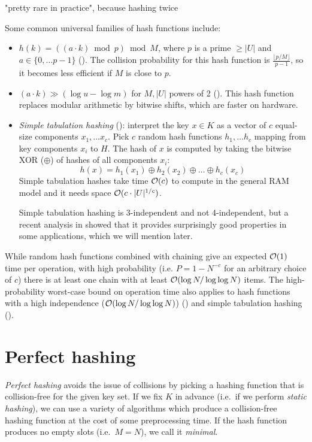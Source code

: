 
"pretty rare in practice", because hashing twice


Some common universal families of hash functions include:
\begin{itemize}
\item $h(k)=((a\cdot k)\bmod p)\bmod M$, where $p$ is a prime $\geq |U|$
	and $a\in\{0,\ldots p-1\}$ (\cite{univ-classes}).
	The collision probability for this hash function is
	$\frac{\lfloor p/M\rfloor}{p-1}$, so it becomes less efficient
	if $M$ is close to $p$.
\item $(a\cdot k)\gg(\log u-\log m)$ for $M, |U|$ powers of 2
	(\cite{dietzfelbinger}).
	This hash function replaces modular arithmetic by bitwise shifts,
	which are faster on hardware.
\item \emph{Simple tabulation hashing} (\cite{univ-classes}):
	interpret the key $x\in K$ as a vector
	of $c$ equal-size components $x_1,\ldots x_c$. Pick $c$ random hash
	functions $h_1,\ldots h_c$ mapping from key components $x_i$ to $H$.
	The hash of $x$ is computed by taking the bitwise XOR ($\oplus$)
	of hashes of all components $x_i$:
	$$h(x)=h_1(x_1)\oplus h_2(x_2)\oplus \ldots \oplus h_c(x_c)$$
	Simple tabulation hashes take time $\mathcal{O}(c)$ to compute in the general RAM
	model and it needs space $\mathcal{O}(c\cdot |U|^{1/c})$.  %

	Simple tabulation hashing is 3-independent and not 4-independent,
	but a recent analysis in \cite{power-of-simple-tab} showed that
	it provides surprisingly good properties in some applications,
	which we will mention later.
\end{itemize}

While random hash functions combined with chaining give an expected $\mathcal{O}(1)$
time per operation, with high probability (i.e.  $P=1-N^{-c}$ for an arbitrary
choice of $c$) there is at least one chain with at least $\mathcal{O}(\log N/\log\log N)$
items. The high-probability worst-case bound on operation time also applies
to hash functions with a high independence ($\mathcal{O}(\log N/\log\log N)$)
(\cite{chernoff-hoeffding-bounds}) and simple tabulation
hashing (\cite{power-of-simple-tab}).

\section{Perfect hashing}
\emph{Perfect hashing} avoids the issue of collisions by picking a hashing
function that is collision-free for the given key set. If we fix $K$
in advance (i.e.\ if we perform \emph{static hashing}), we can use a variety
of algorithms which produce a collision-free hashing function at the cost
of some preprocessing time. If the hash function produces no empty slots
(i.e.\ $M=N$), we call it \emph{minimal}.

